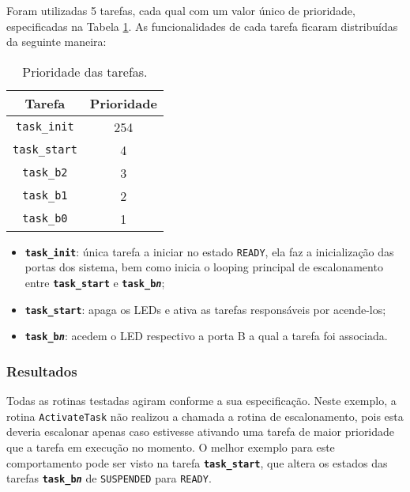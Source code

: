 \documentclass[conference,compsoc]{IEEEtran}
\newcommand{\reffig}[1]{Figura \ref{fig:#1}}
\newcommand{\reftab}[1]{Tabela \ref{tab:#1}}
\newcommand{\figura}[5][Extraido de:]{
	\begin{figure}[h!tb]
		\centering
		\caption{#3.}
		\texttt{[image: \#2.png]}
		\ifthenelse{\isempty{#5}}{}{%
			\\ #1 \cite{#5}.
		}	
		\label{fig:#2}
	\end{figure}
}
\begin{document}
Foram utilizadas 5 tarefas, cada qual com um valor único de prioridade, especificadas na \reftab{cap5_scheduler_p}. As funcionalidades de cada tarefa ficaram distribuídas da seguinte maneira:

\begin{table}[h]
	\centering
	\caption{Prioridade das tarefas.}
	\label{tab:cap5_scheduler_p}
	\begin{tabular}{cc}
		Tarefa               & Prioridade \\ \hline \hline
		\texttt{task\_init}  & 254        \\ \hline
		\texttt{task\_start} & 4          \\ \hline
		\texttt{task\_b2}    & 3          \\ \hline
		\texttt{task\_b1}    & 2          \\ \hline
		\texttt{task\_b0}    & 1          \\ \hline
	\end{tabular}
\end{table}

\begin{itemize}
	\item \textbf{\texttt{task\_init}}: única tarefa a iniciar no estado \texttt{READY}, ela faz a inicialização das portas dos sistema, bem como inicia o looping principal de escalonamento entre \textbf{\texttt{task\_start}} e \textbf{\texttt{task\_b\textit{n}}};
	\item \textbf{\texttt{task\_start}}: apaga os LEDs e ativa as tarefas responsáveis por acende-los;
	\item \textbf{\texttt{task\_b\textit{n}}}: acedem o LED respectivo a porta B a qual a tarefa foi associada.
\end{itemize}



\subsubsection{Resultados}

Todas as rotinas testadas agiram conforme a sua especificação. Neste exemplo, a rotina \texttt{ActivateTask} não realizou a chamada a rotina de escalonamento, pois esta deveria escalonar apenas caso estivesse ativando uma tarefa de maior prioridade que a tarefa em execução no momento. O melhor exemplo para este comportamento pode ser visto na tarefa \textbf{\texttt{task\_start}}, que altera os estados das tarefas \textbf{\texttt{task\_b\textit{n}}} de \texttt{SUSPENDED} para \texttt{READY}.
\end{document}
